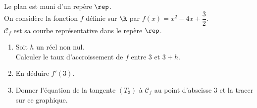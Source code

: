 \documentclass[a4paper,11pt,exos]{nsi}
\begin{document}
\begin{minipage}{10.5cm}
    \exo{}
	Le plan est muni d'un repère $\rep$.\\
	On considère la fonction $f$ définie sur $\R$ par $f(x)=x^2-4x+\dfrac{3}{2}$.\\
	
	$\mathcal{C}_f$ est sa courbe représentative dans le repère $\rep$.
	\begin{enumerate}[]
		\item 	Soit $h$ un réel non nul.\\
        Calculer le taux d'accroissement de $f$ entre $3$ et $3+h$.
		\item En déduire $f'(3)$.
		\item 	Donner l'équation de la tangente $(T_3)$ à $\mathcal{C}_f$ au point d'abscisse 3 et la tracer sur ce graphique.\\
	\end{enumerate}
\end{minipage}
\begin{minipage}{6.5cm}
	\begin{center}
	\end{center}
\end{minipage}
\end{document}

